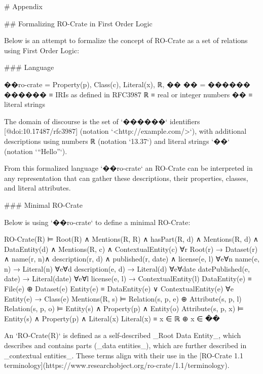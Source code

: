 # Appendix


## Formalizing RO-Crate in First Order Logic

Below is an attempt to formalize the concept of RO-Crate as a set of relations using First Order Logic:

### Language

    ��ro-crate = { Property(p), Class(c), Literal(x), ℝ, �� }
    �� =  ������
    ������ ≡  { IRIs as defined in RFC3987 }
    ℝ ≡  { real or integer numbers }
    �� ≡  { literal strings }

The domain of discourse is the set of `������` identifiers [@doi:10.17487/rfc3987] (notation `<http://example.com/>`), with additional descriptions using numbers ℝ (notation `13.37`) and literal strings `��` (notation `“Hello”`). 

From this formalized language `��ro-crate` an RO-Crate can be interpreted in any representation that can gather these descriptions, their properties, classes, and literal attributes.  

### Minimal RO-Crate

Below is using `��ro-crate` to define a minimal RO-Crate:

    RO-Crate(R) ⊨  Root(R) ∧ Mentions(R, R) ∧
        hasPart(R, d) ∧ Mentions(R, d) ∧ DataEntity(d) ∧
        Mentions(R, c) ∧ ContextualEntity(c)
    ∀r Root(r) →  Dataset(r) ∧ name(r, n)∧ description(r, d)
                            ∧ published(r, date) ∧ license(e, l)
    ∀e∀n name(e, n) →  Literal(n)
    ∀e∀d description(e, d) →  Literal(d)
    ∀e∀date datePublished(e, date) →  Literal(date)
    ∀e∀l license(e, l) →  ContextualEntity(l)
    DataEntity(e) ≡  File(e) ⊕ Dataset(e)
    Entity(e) ≡  DataEntity(e) ∨ ContextualEntity(e)
    ∀e Entity(e) → Class(e)
    Mentions(R, s) ⊨  Relation(s, p, e)  ⊕  Attribute(s, p, l)
    Relation(s, p, o) ⊨ Entity(s) ∧ Property(p) ∧ Entity(o)
    Attribute(s, p, x) ⊨ Entity(s)  ∧ Property(p) ∧ Literal(x)
    Literal(x) ≡  x ∈ ℝ  ⊕   x ∈ ��

An `RO-Crate(R)` is defined as a self-described _Root Data Entity_, which describes and contains parts (_data entities_), which are further described in _contextual entities_.  These terms align with their use in the [RO-Crate 1.1 terminology](https://www.researchobject.org/ro-crate/1.1/terminology). 

